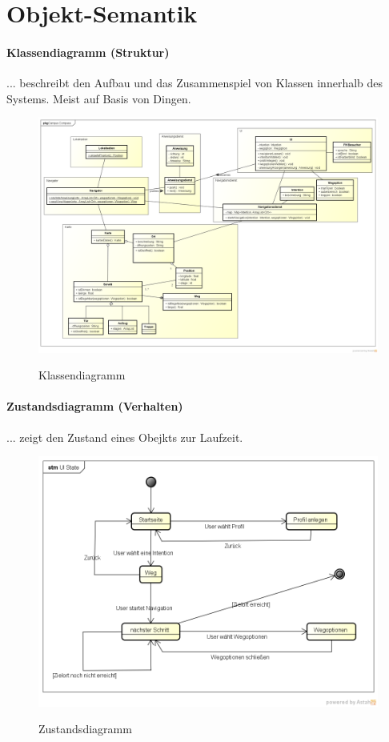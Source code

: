 \chapter{Objekt-Semantik}

\subsubsection*{Klassendiagramm (Struktur)}
... beschreibt den Aufbau und das Zusammenspiel von Klassen innerhalb des Systems. Meist auf Basis von Dingen.

\begin{figure}[hbt]
  \centering
  \includegraphics[width=\linewidth]{img/klassendiagramm.png}
  \label{img:klassendiagramm}
  \caption{Klassendiagramm}
\end{figure}

\subsubsection*{Zustandsdiagramm (Verhalten)}
... zeigt den Zustand eines Obejkts zur Laufzeit.

\begin{figure}[hbt]
  \centering
  \includegraphics[width=\linewidth]{img/zustandsdiagramm.png}
  \label{img:zustandsdiagramm}
  \caption{Zustandsdiagramm}
\end{figure}

